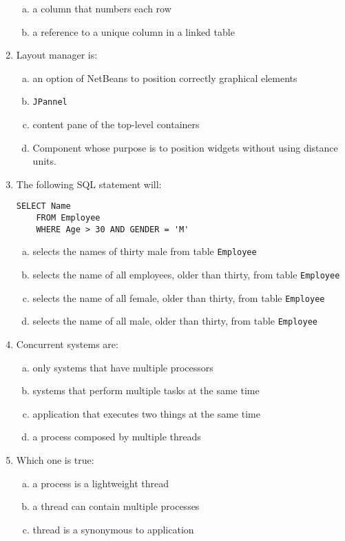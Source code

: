 \documentclass[10pt,a4paper,twocolumn]{article}
\begin{document}
\begin{enumerate}
\begin{enumerate}[(a)]
	\item a column that numbers each row
	\item a reference to a unique column in a linked table
\end{enumerate}
\item Layout manager is:
\begin{enumerate}[(a)]
	\item an option of NetBeans to position correctly graphical elements
	\item \texttt{JPannel}
	\item content pane of the top-level containers
	\item Component whose purpose is to position widgets without using distance units.
\end{enumerate}
\item The following SQL statement will:
\begin{verbatim}
SELECT Name
    FROM Employee
    WHERE Age > 30 AND GENDER = 'M'
\end{verbatim}
\begin{enumerate}[(a)]
	\item selects the names of thirty male from table  \texttt{Employee}
	\item selects the name of all employees, older than thirty, from table \texttt{Employee}
	\item selects the name of all female, older than thirty, from table \texttt{Employee}
	\item selects the name of all male, older than thirty, from table \texttt{Employee}
\end{enumerate}
\item Concurrent systems are:
\begin{enumerate}[(a)]
	\item only systems that have multiple processors
	\item systems that perform multiple tasks at the same time
	\item application that executes two things at the same time
	\item a process composed by multiple threads
\end{enumerate}
\item Which one is true:
\begin{enumerate}[(a)]
	\item a process is a lightweight thread
	\item a thread can contain multiple processes
	\item thread is a synonymous to application

\end{enumerate}
\end{enumerate}
\end{document}
